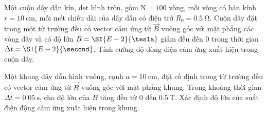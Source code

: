 \begin{ex}
	Một cuộn dây dẫn kín, dẹt hình tròn, gồm $\mathrm{N}=100$ vòng, mỗi vòng có bán kính $r=\SI{10}{\centi\meter}$, mỗi mét chiều dài của dây dẫn có điện trở $R_0=\SI{0.5}{\ohm}$. Cuộn dây đặt trong một từ trường đều có vector cảm ứng từ $\vec{B}$ vuông góc với mặt phẳng các vòng dây và có độ lớn $B=\SI{E-2}{\tesla}$ giảm đều đến 0 trong thời gian $\Delta t=\SI{E-2}{\second}$. Tính cường độ dòng điện cảm ứng xuất hiện trong cuộn dây.
\end{ex}
\begin{ex}
	Một khung dây dẫn hình vuông, cạnh $a=\SI{10}{\centi\meter}$, đặt cố định trong từ trường đều có vector cảm ứng từ $\vec{B}$ vuông góc với mặt phẳng khung. Trong khoảng thời gian $\Delta t=\SI{0.05}{\second}$, cho độ lớn của $B$ tăng đều từ 0 đến $\SI{0.5}{\tesla}$. Xác định độ lớn của suất điện động cảm ứng xuất hiện trong khung.
\end{ex}
